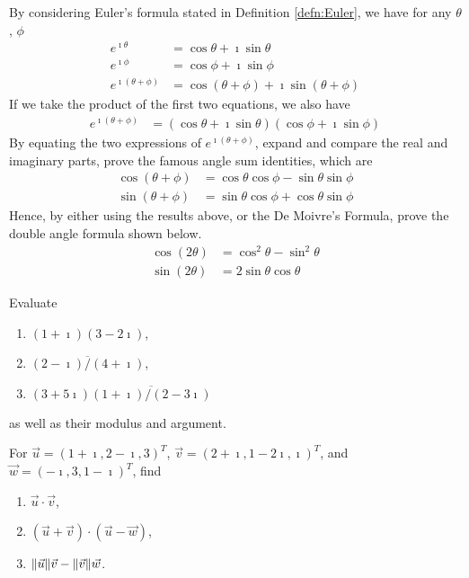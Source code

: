 \begin{Exercise}
By considering Euler's formula stated in Definition \ref{defn:Euler}, we have for any $\theta$, $\phi$
\begin{align*}
e^{\imath \theta} &= \cos \theta + \imath \sin \theta \\
e^{\imath \phi} &= \cos \phi + \imath \sin \phi \\
e^{\imath (\theta+\phi)} &= \cos (\theta+\phi) + \imath \sin (\theta+\phi)
\end{align*}
If we take the product of the first two equations, we also have
\begin{align*}
e^{\imath (\theta+\phi)} &= (\cos \theta + \imath \sin \theta)(\cos \phi + \imath \sin \phi)
\end{align*}
By equating the two expressions of $e^{\imath (\theta+\phi)}$, expand and compare the real and imaginary parts, prove the famous angle sum identities, which are
\begin{align*}
\cos(\theta+\phi) &= \cos\theta \cos\phi - \sin\theta \sin\phi \\
\sin(\theta+\phi) &= \sin\theta \cos\phi + \cos\theta \sin\phi 
\end{align*}
Hence, by either using the results above, or the De Moivre's Formula, prove the double angle formula shown below.
\begin{align*}
\cos(2\theta) &= \cos^2\theta - \sin^2\theta \\
\sin(2\theta) &= 2\sin\theta \cos\theta  
\end{align*}
\end{Exercise}

\begin{Exercise}
Evaluate
\begin{enumerate}[label=(\alph*)]
\item $(1+\imath)(3-2\imath)$,
\item $\overline{(2-\imath)/(4+\imath)}$,
\item $(3+5\imath)\overline{(1+\imath)/(2-3\imath)}$
\end{enumerate}
as well as their modulus and argument.
\end{Exercise}

\begin{Exercise}
For $\vec{u} = (1+\imath, 2-\imath, 3)^T$, $\vec{v} = (2+\imath, 1-2\imath, \imath)^T$, and $\vec{w} = (-\imath, 3, 1-\imath)^T$, find
\begin{enumerate}[label=(\alph*)]
\item $\vec{u} \cdot \vec{v}$,
\item $(\vec{u} + \vec{v}) \cdot (\vec{u} - \vec{w})$,
\item $\norm{\vec{u}} \vec{v} - \norm{\vec{v}} \vec{w}$.
\end{enumerate}
\end{Exercise}


